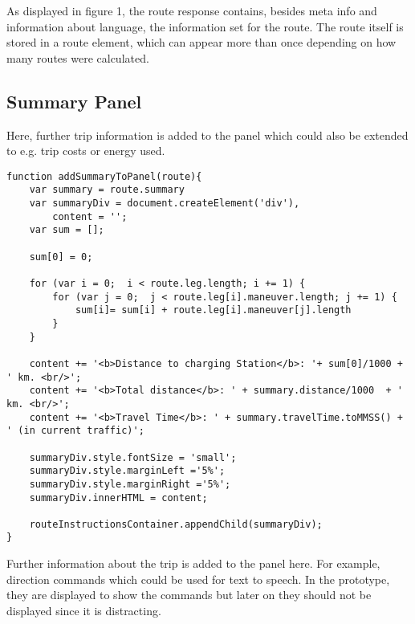 As displayed in figure 1, the route response contains, besides meta info and information about language, the information set for the route. The route itself is stored in a route element, which can appear more than once depending on how many routes were calculated. 


\subsection{Summary Panel}

Here, further trip information is added to the panel which could also be extended to e.g. trip costs or energy used.

\begin{verbatim}
function addSummaryToPanel(route){
    var summary = route.summary
    var summaryDiv = document.createElement('div'),
        content = '';
    var sum = [];

    sum[0] = 0;

    for (var i = 0;  i < route.leg.length; i += 1) {
        for (var j = 0;  j < route.leg[i].maneuver.length; j += 1) {
            sum[i]= sum[i] + route.leg[i].maneuver[j].length
        }
    }

    content += '<b>Distance to charging Station</b>: '+ sum[0]/1000 + ' km. <br/>';
    content += '<b>Total distance</b>: ' + summary.distance/1000  + ' km. <br/>';
    content += '<b>Travel Time</b>: ' + summary.travelTime.toMMSS() + ' (in current traffic)';

    summaryDiv.style.fontSize = 'small';
    summaryDiv.style.marginLeft ='5%';
    summaryDiv.style.marginRight ='5%';
    summaryDiv.innerHTML = content;

    routeInstructionsContainer.appendChild(summaryDiv);
}
\end{verbatim}

Further information about the trip is added to the panel here. For example, direction commands which could be used for text to speech. In the prototype, they are displayed to show the commands but later on they should not be displayed since it is distracting.

